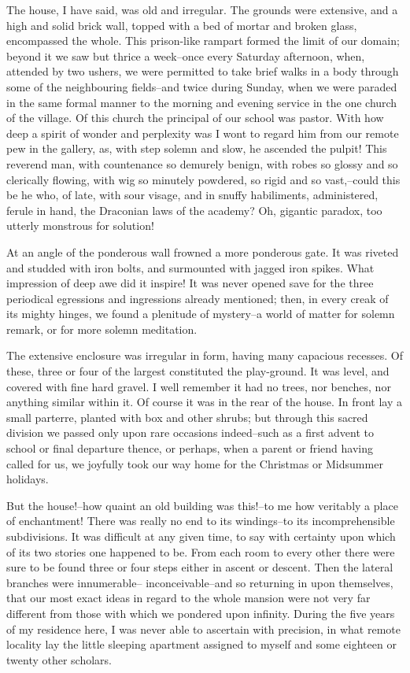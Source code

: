 \documentclass[12pt]{book}
\begin{document}
     The house, I have said, was old and irregular.  The grounds
were extensive, and a high and solid brick wall, topped with
a bed of mortar and broken glass, encompassed the whole.  This
prison-like rampart formed the limit of our domain; beyond it we
saw but thrice a week--once every Saturday afternoon, when,
attended by two ushers, we were permitted to take brief walks in a
body through some of the neighbouring fields--and twice during
Sunday, when we were paraded in the same formal manner to the
morning and evening service in the one church of the village.  Of
this church the principal of our school was pastor.  With how deep
a spirit of wonder and perplexity was I wont to regard him from our
remote pew in the gallery, as, with step solemn and slow, he
ascended the pulpit!  This reverend man, with countenance so
demurely benign, with robes so glossy and so clerically flowing,
with wig so minutely powdered, so rigid and so vast,--could this be
he who, of late, with sour visage, and in snuffy habiliments,
administered, ferule in hand, the Draconian laws of the academy? 
Oh, gigantic paradox, too utterly monstrous for solution!

     At an angle of the ponderous wall frowned a more ponderous
gate.  It was riveted and studded with iron bolts, and surmounted
with jagged iron spikes.  What impression of deep awe did it
inspire!  It was never opened save for the three periodical
egressions and ingressions already mentioned; then, in every creak
of its mighty hinges, we found a plenitude of mystery--a world of
matter for solemn remark, or for more solemn meditation.

     The extensive enclosure was irregular in form, having many
capacious recesses.  Of these, three or four of the largest
constituted the play-ground.  It was level, and covered with fine
hard gravel.  I well remember it had no trees, nor benches, nor
anything similar within it.  Of course it was in the rear of the
house.  In front lay a small parterre, planted with box and other
shrubs; but through this sacred division we passed only upon rare
occasions indeed--such as a first advent to school or final
departure thence, or perhaps, when a parent or friend having called
for us, we joyfully took our way home for the Christmas or
Midsummer holidays.

     But the house!--how quaint an old building was this!--to me
how veritably a place of enchantment!  There was really no end to
its windings--to its incomprehensible subdivisions.  It was
difficult at any given time, to say with certainty upon which of
its two stories one happened to be.  From each room to every
other there were sure to be found three or four steps either in
ascent or descent.  Then the lateral branches were innumerable--
inconceivable--and so returning in upon themselves, that our most
exact ideas in regard to the whole mansion were not very far
different from those with which we pondered upon infinity.  During
the five years of my residence here, I was never able to ascertain
with precision, in what remote locality lay the little sleeping
apartment assigned to myself and some eighteen or twenty other
scholars.
\end{document}
